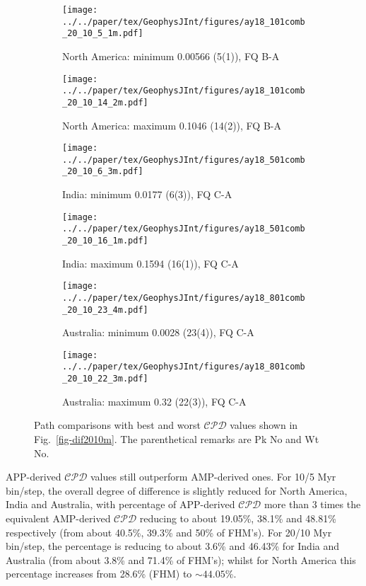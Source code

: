 \begin{figure*}
	\centering
	\begin{subfigure}{.43\textwidth}
		\texttt{[image: ../../paper/tex/GeophysJInt/figures/ay18\_101comb\_20\_10\_5\_1m.pdf]}
		\caption{North America: minimum 0.00566 (5(1)), FQ B-A}
	\end{subfigure}
	\begin{subfigure}{.43\textwidth}
		\texttt{[image: ../../paper/tex/GeophysJInt/figures/ay18\_101comb\_20\_10\_14\_2m.pdf]}
		\caption{North America: maximum 0.1046 (14(2)), FQ B-A}
	\end{subfigure}
	\vspace{.1em}
	\begin{subfigure}{.43\textwidth}
		\texttt{[image: ../../paper/tex/GeophysJInt/figures/ay18\_501comb\_20\_10\_6\_3m.pdf]}
		\caption{India: minimum 0.0177 (6(3)), FQ C-A}
	\end{subfigure}
	\begin{subfigure}{.43\textwidth}
		\texttt{[image: ../../paper/tex/GeophysJInt/figures/ay18\_501comb\_20\_10\_16\_1m.pdf]}
		\caption{India: maximum 0.1594 (16(1)), FQ C-A}
	\end{subfigure}
	\vspace{.1em}
	\begin{subfigure}{.43\textwidth}
		\texttt{[image: ../../paper/tex/GeophysJInt/figures/ay18\_801comb\_20\_10\_23\_4m.pdf]}
		\caption{Australia: minimum 0.0028 (23(4)), FQ C-A}
	\end{subfigure}
	\begin{subfigure}{.43\textwidth}
		\texttt{[image: ../../paper/tex/GeophysJInt/figures/ay18\_801comb\_20\_10\_22\_3m.pdf]}
		\caption{Australia: maximum 0.32 (22(3)), FQ C-A}
	\end{subfigure}
	\caption[Best and worst $\mathcal{CPD}$s (20/10 Myr window/step;
MHM)]{Path comparisons with best and worst $\mathcal{CPD}$ values shown in
Fig.~\ref{fig-dif2010m}. The parenthetical remarks are Pk No and Wt No.}\label{fig-dif2010bwm}
\end{figure*}

APP-derived $\mathcal{CPD}$ values still outperform AMP-derived ones. For 10/5
Myr bin/step, the overall degree of difference is slightly reduced for North
America, India and Australia, with percentage of APP-derived $\mathcal{CPD}$
more than 3 times the equivalent AMP-derived $\mathcal{CPD}$ reducing to about
19.05\%, 38.1\% and 48.81\% respectively (from about 40.5\%, 39.3\% and 50\% of
FHM's). For 20/10 Myr bin/step, the percentage is reducing to about 3.6\% and
46.43\% for India and Australia (from about 3.8\% and 71.4\% of FHM's); whilst
for North America this percentage increases from 28.6\% (FHM) to
${\sim}44.05$\%.


